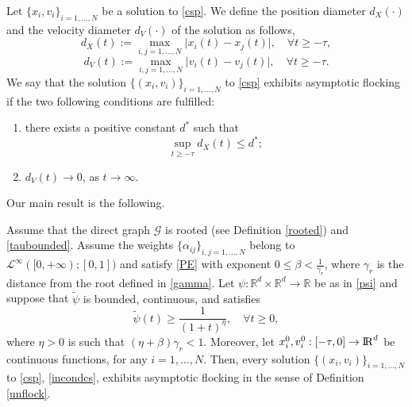 \documentclass[11pt]{article}
\newcommand{\RR}{{{\rm I} \kern -.15em {\rm R} }}
\begin{document}
    \begin{defn}\label{unflock}
    	Let $\{x_{i},v_i\}_{i=1,\dots,N}$ be a solution to \eqref{csp}. We define the position diameter $d_X(\cdot)$ and the velocity diameter $d_V(\cdot)$ of the solution as follows, 
    	\begin{equation}\label{posdiam}
    		d_{X}(t):=\max_{i,j=1,\dots,N}\lvert x_{i}(t)-x_{j}(t)\rvert,\quad \forall t\geq-\tau,
    	\end{equation}
    	\begin{equation}\label{veldiam}
    		d_{V}(t):=\max_{i,j=1,\dots,N}\lvert v_{i}(t)-v_{j}(t)\rvert,\quad \forall t\geq -\tau.
    	\end{equation}
    	We say that the solution $\{(x_{i},v_{i})\}_{i=1,\dots,N}$ to \eqref{csp} exhibits asymptotic flocking if the two following conditions are fulfilled:
    	\begin{enumerate}
    		\item there exists a positive constant $d^{*}$ such that $$\sup_{t\geq-{\tau}}d_{X}(t)\leq d^{*};$$
    		\item $d_V(t)\to 0$, as $t\to \infty$.
    	\end{enumerate}
    	
    \end{defn}
Our main result is the following.
\begin{thm} \label{uf}
	Assume that the direct graph $\mathcal{G}$ is rooted (see Definition \ref{rooted}) and \eqref{taubounded}. Assume the weights $\{\alpha_{ij}\}_{i,j=1,\dots,N}$ belong to $\mathcal{L}^\infty([0,+\infty);[0,1])$ and satisfy \eqref{PE} with exponent $0\leq\beta<\frac{1}{\gamma_r}$, where $\gamma_{r}$ is the distance from the root defined in \eqref{gamma}. Let $\psi:\mathbb{R}^d\times\mathbb{R}^d\rightarrow\mathbb{R}$ be as in \eqref{psi} and suppose that {$\tilde \psi$ is bounded, continuous, and satisfies 
    \begin{equation}\label{infint}
		\tilde\psi(t)\geq \frac{1}{(1+t)^\eta},\quad \forall t\geq 0,
	\end{equation}}
    where $\eta>0$ is such that $(\eta+\beta)\gamma_r<1$.
    Moreover, let $x^{0}_{i},v_{i}^{0}:[-{\tau},0]\rightarrow \RR^{d}$ be continuous functions, for any $i=1,\dots,N$. Then, every solution $\{(x_{i},v_{i})\}_{i=1,\dots,N}$ to \eqref{csp}, \eqref{incondcs}, exhibits asymptotic flocking in the sense of Definition \ref{unflock}.
	\end{thm}
\end{document}
